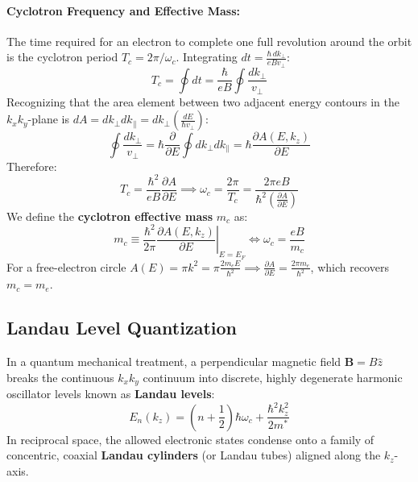 \documentclass[11pt,a4paper]{article}
\newcommand{\vb}[1]{\mathbf{#1}}
\begin{document}
\paragraph{Cyclotron Frequency and Effective Mass:}
The time required for an electron to complete one full revolution around the orbit is the cyclotron period $T_c = 2\pi/\omega_c$. Integrating $dt = \frac{\hbar\, dk_\perp}{e B v_\perp}$:
\begin{equation}
T_c = \oint dt = \frac{\hbar}{e B}\oint \frac{dk_\perp}{v_\perp}
\end{equation}
Recognizing that the area element between two adjacent energy contours in the $k_x k_y$-plane is $dA = dk_\perp dk_\parallel = dk_\perp \left( \frac{dE}{\hbar v_\perp} \right)$:
\begin{equation}
\oint \frac{dk_\perp}{v_\perp} = \hbar \frac{\partial}{\partial E}\oint dk_\perp dk_\parallel = \hbar \frac{\partial A(E, k_z)}{\partial E}
\end{equation}
Therefore:
\begin{equation}
T_c = \frac{\hbar^2}{e B}\frac{\partial A}{\partial E} \implies \omega_c = \frac{2\pi}{T_c} = \frac{2\pi e B}{\hbar^2 \left(\frac{\partial A}{\partial E}\right)}
\end{equation}
We define the \textbf{cyclotron effective mass} $m_c$ as:
\begin{equation}
\boxed{m_c \equiv \frac{\hbar^2}{2\pi}\left.\frac{\partial A(E, k_z)}{\partial E}\right|_{E=E_F}} \iff \omega_c = \frac{e B}{m_c}
\label{eq:cyclotron_mass_def}
\end{equation}
For a free-electron circle $A(E) = \pi k^2 = \pi \frac{2m_e E}{\hbar^2} \implies \frac{\partial A}{\partial E} = \frac{2\pi m_e}{\hbar^2}$, which recovers $m_c = m_e$.

\subsection{Landau Level Quantization}
In a quantum mechanical treatment, a perpendicular magnetic field $\vb{B} = B\hat{z}$ breaks the continuous $k_x k_y$ continuum into discrete, highly degenerate harmonic oscillator levels known as \textbf{Landau levels}:
\begin{equation}
E_n(k_z) = \left(n + \frac{1}{2}\right)\hbar\omega_c + \frac{\hbar^2 k_z^2}{2m^*}
\label{eq:landau_levels}
\end{equation}
In reciprocal space, the allowed electronic states condense onto a family of concentric, coaxial \textbf{Landau cylinders} (or Landau tubes) aligned along the $k_z$-axis. 
\end{document}
